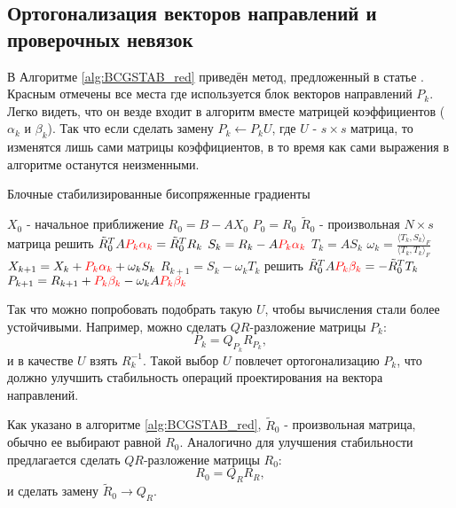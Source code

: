 \subsection{Ортогонализация векторов направлений и проверочных невязок}

В Алгоритме \ref{alg:BCGSTAB_red} приведён метод, предложенный в статье \cite{elGuennouni2003}. Красным отмечены
все места где используется блок векторов направлений $P_k$. Легко видеть, что он везде
входит в алгоритм вместе матрицей коэффициентов ($\alpha_k$ и $\beta_k$). Так что если сделать замену
$P_k \gets P_k U$, где $U$ - $s \times s$ матрица, то изменятся лишь сами матрицы коэффициентов,
в то время как сами выражения в алгоритме останутся неизменными.       
\begin{algorithm}
    \caption{Блочные стабилизированные бисопряженные градиенты}\label{alg:BCGSTAB_red}
    \begin{algorithmic}
    \State $X_0$ - начальное приближение
    \State $R_0 = B - AX_0$
    \State $P_0 = R_0$
    \State $\tilde{R}_0$ - произвольная $N \times s$ матрица
        \State решить $\tilde{R}_0^TA {\color{red}P_k\alpha_k} = \tilde{R}_0^TR_k$
        \State $S_k=R_k-A{\color{red}P_k\alpha_k}$
        \State $T_k=AS_k$
        \State $\omega_k = \frac{\langle T_k,S_k\rangle_F}{\langle T_k, T_k\rangle_F}$
        \State $X_{k+1}=X_k + {\color{red}P_k\alpha_k} + \omega_kS_k$
        \State $R_{k+1} = S_k - \omega_k T_k$
        \State решить $\tilde{R}_0^TA{\color{red}P_k\beta_k} = -\tilde{R}_0^TT_k$
        \State $P_{k+1}=R_{k+1} + {\color{red}P_k\beta_k} - \omega_k A{\color{red}P_k\beta_k}$
    \EndFor  
    \end{algorithmic}
\end{algorithm}
Так что можно попробовать подобрать такую $U$, чтобы вычисления стали более устойчивыми. Например, можно 
сделать $QR$-разложение матрицы $P_k$:
$$P_k = Q_{P_{k}} R_{P_{k}},$$
и в качестве $U$ взять $R_k^{-1}$. Такой выбор $U$ повлечет ортогонализацию $P_k$, что должно улучшить стабильность
операций проектирования на вектора направлений.
\par Как указано в алгоритме \ref{alg:BCGSTAB_red}, $\tilde{R}_0$ - произвольная матрица, обычно ее выбирают равной
$R_0$. Аналогично для улучшения стабильности предлагается сделать $QR$-разложение матрицы
$R_0$:
$$R_0 = Q_R R_R,$$
и сделать замену $\tilde{R}_0 \rightarrow Q_R$.

